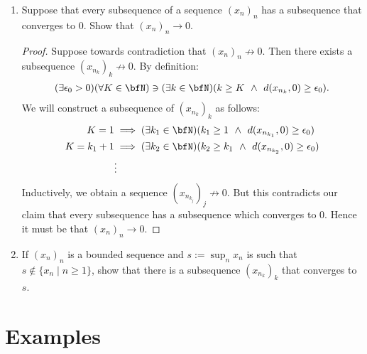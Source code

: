\begin{enumerate}[label = (\arabic*)]
        \item Suppose that every subsequence of a sequence $(x_n)_n$ has a subsequence that converges to $0$. Show that $(x_n)_n \rightarrow 0$.
            {\color{red} \begin{proof}
                Suppose towards contradiction that $(x_n)_n \not\rightarrow 0$. Then there exists a subsequence $(x_{n_k})_k \not\rightarrow 0$. By definition:
                    \begin{equation*}
                    \begin{split}
                        (\exists \epsilon_0 > 0)(\forall K \in \bfN) \ni (\exists k \in \bfN)(k \geq K \hspace{4pt}\land \hspace{4pt} d(x_{n_k} , 0) \geq \epsilon_0).
                    \end{split}
                    \end{equation*}
                We will construct a subsequence of $(x_{n_k})_k$ as follows:
                    \begin{equation*}
                    \begin{split}
                        K = 1 &\implies (\exists k_1 \in \bfN)(k_1 \geq 1 \hspace{4pt}\land\hspace{4pt} d(x_{n_{k_1}}, 0) \geq \epsilon_0) \\
                        K = k_1 + 1 &\implies (\exists k_2 \in \bfN)(k_2 \geq k_1 \hspace{4pt}\land\hspace{4pt} d(x_{n_{k_2}}, 0) \geq \epsilon_0) \\
                        &\vdots 
                    \end{split}
                    \end{equation*}
                Inductively, we obtain a sequence $(x_{n_{k_j}})_j \not\rightarrow 0$. But this contradicts our claim that every subsequence has a subsequence which converges to $0$. Hence it must be that $(x_n)_n \rightarrow 0$.
            \end{proof}}

        \item If $(x_n)_n$ is a bounded sequence and $s:= \sup_n x_n$ is such that $s \not\in \{x_n \mid n \geq 1\}$, show that there is a subsequence $(x_{n_k})_k$ that converges to $s$.
    \end{enumerate}
\section*{Examples}